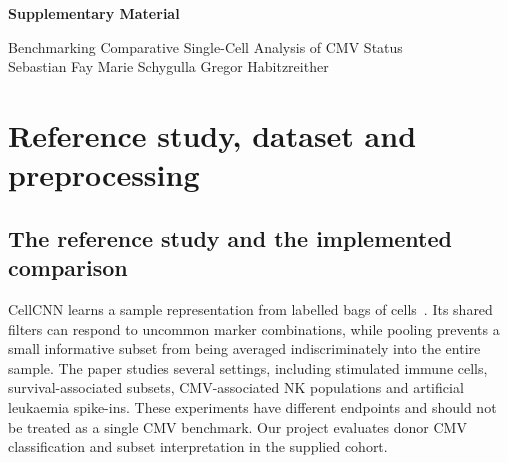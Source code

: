 \documentclass[11pt,a4paper]{article}
\begin{document}
\begin{center}
{\Large\bfseries Supplementary Material\par}
\vspace{3pt}
Benchmarking Comparative Single-Cell Analysis of CMV Status\\
Sebastian Fay \quad Marie Schygulla \quad Gregor Habitzreither
\end{center}

\section{Reference study, dataset and preprocessing}
\subsection{The reference study and the implemented comparison}
CellCNN learns a sample representation from labelled bags of cells~\cite{cellcnn}. Its shared filters can respond to uncommon marker combinations, while pooling prevents a small informative subset from being averaged indiscriminately into the entire sample. The paper studies several settings, including stimulated immune cells, survival-associated subsets, CMV-associated NK populations and artificial leukaemia spike-ins. These experiments have different endpoints and should not be treated as a single CMV benchmark. Our project evaluates donor CMV classification and subset interpretation in the supplied cohort.
\end{document}
